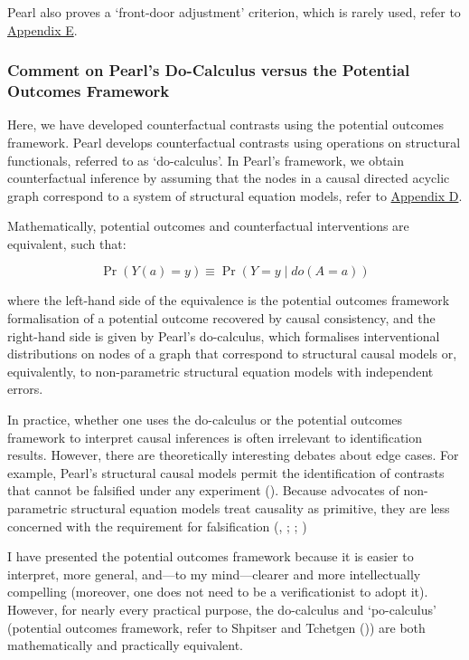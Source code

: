 \documentclass[
  single column]{article}
\begin{document}
Pearl also proves a `front-door adjustment' criterion, which is rarely
used, refer to \hyperref[id-app-e]{Appendix E}.

\subsubsection{Comment on Pearl's Do-Calculus versus the Potential
Outcomes
Framework}\label{comment-on-pearls-do-calculus-versus-the-potential-outcomes-framework}

Here, we have developed counterfactual contrasts using the potential
outcomes framework. Pearl develops counterfactual contrasts using
operations on structural functionals, referred to as `do-calculus'. In
Pearl's framework, we obtain counterfactual inference by assuming that
the nodes in a causal directed acyclic graph correspond to a system of
structural equation models, refer to \hyperref[id-app-d]{Appendix D}.

Mathematically, potential outcomes and counterfactual interventions are
equivalent, such that:

\[
\Pr(Y(a) = y) \equiv \Pr(Y = y \mid do(A = a))
\]

where the left-hand side of the equivalence is the potential outcomes
framework formalisation of a potential outcome recovered by causal
consistency, and the right-hand side is given by Pearl's do-calculus,
which formalises interventional distributions on nodes of a graph that
correspond to structural causal models or, equivalently, to
non-parametric structural equation models with independent errors.

In practice, whether one uses the do-calculus or the potential outcomes
framework to interpret causal inferences is often irrelevant to
identification results. However, there are theoretically interesting
debates about edge cases. For example, Pearl's structural causal models
permit the identification of contrasts that cannot be falsified under
any experiment (). Because advocates of non-parametric structural equation models
treat causality as primitive, they are less concerned with the
requirement for falsification (, ;
;
)

I have presented the potential outcomes framework because it is easier
to interpret, more general, and---to my mind---clearer and more
intellectually compelling (moreover, one does not need to be a
verificationist to adopt it). However, for nearly every practical
purpose, the do-calculus and `po-calculus' (potential outcomes
framework, refer to Shpitser and Tchetgen
()) are both mathematically and
practically equivalent.
\end{document}
